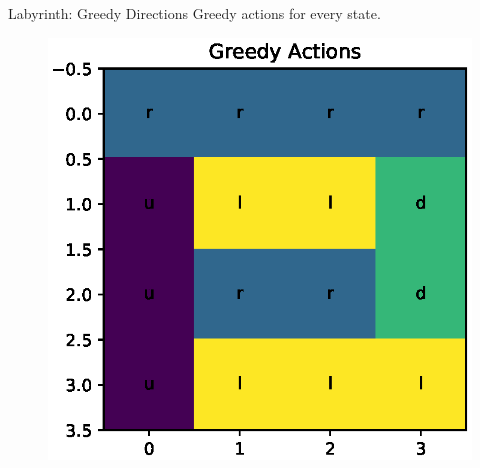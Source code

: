 \documentclass{beamer}
\begin{document}
\begin{frame}{Labyrinth: Greedy Directions}
	Greedy actions for every state.
	\begin{figure}
	\centering
	\includegraphics[width=0.7\linewidth]{Images/greedy_directions.eps}\\	
	\end{figure}
\end{frame}

\end{document}
